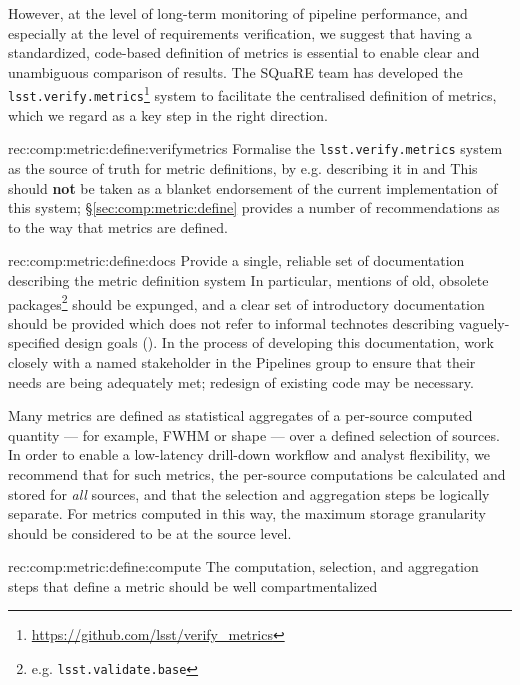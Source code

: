 However, at the level of long-term monitoring of pipeline performance, and especially at the level of requirements verification, we suggest that having a standardized, code-based definition of metrics is essential to enable clear and unambiguous comparison of results.
The SQuaRE team has developed the \texttt{lsst.verify.metrics}\footnote{\url{https://github.com/lsst/verify_metrics}} system to facilitate the centralised definition of metrics, which we regard as a key step in the right direction.

\begin{recommendation}
    {rec:comp:metric:define:verifymetrics}
    {Formalise the \texttt{lsst.verify.metrics} system as the source of truth for metric definitions, by e.g. describing it in  and }
    This should \textbf{not} be taken as a blanket endorsement of the current implementation of this system; \S\ref{sec:comp:metric:define} provides a number of recommendations as to the way that metrics are defined.
\end{recommendation}

\begin{recommendation}
    {rec:comp:metric:define:docs}
    {Provide a single, reliable set of documentation describing the metric definition system}
    In particular, mentions of old, obsolete packages\footnote{e.g. \texttt{lsst.validate.base}} should be expunged, and a clear set of introductory documentation should be provided which does not refer to informal technotes describing vaguely-specified design goals ().
    In the process of developing this documentation, work closely with a named stakeholder in the Pipelines group to ensure that their needs are being adequately met; redesign of existing code may be necessary.
\end{recommendation}

Many metrics are defined as statistical aggregates of a per-source computed quantity --- for example, FWHM or shape --- over a defined selection of sources.
In order to enable a low-latency drill-down workflow and analyst flexibility, we recommend that for such metrics, the per-source computations be calculated and stored for \emph{all} sources, and that the selection and aggregation steps be logically separate.
For metrics computed in this way, the maximum storage granularity should be considered to be at the source level.

\begin{recommendation}
    {rec:comp:metric:define:compute}
    {The computation, selection, and aggregation steps that define a metric should be well compartmentalized}
\end{recommendation}

